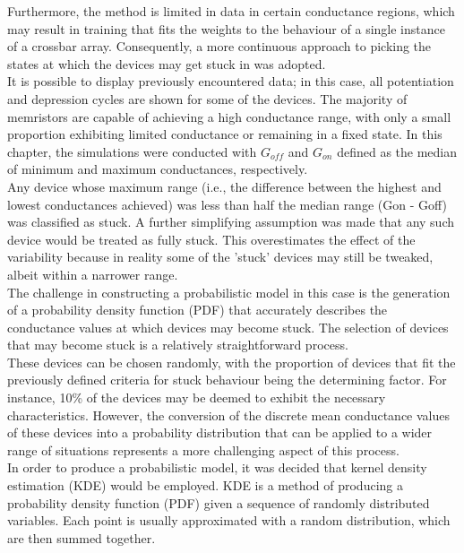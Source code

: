 \noindent Furthermore, the method is limited in data in certain conductance regions, which may result in training that fits the weights to the behaviour of a single instance of a crossbar array. Consequently, a more continuous approach to picking the states at which the devices may get stuck in was adopted.\\

\noindent It is possible to display previously encountered data; in this case, all potentiation and depression cycles are shown for some of the devices. The majority of memristors are capable of achieving a high conductance range, with only a small proportion exhibiting limited conductance or remaining in a fixed state. In this chapter, the simulations were conducted with $G_{off}$ and $G_{on}$ defined as the median of minimum and maximum conductances, respectively. \\

\noindent Any device whose maximum range (i.e., the difference between the highest and lowest conductances achieved) was less than half the median range (Gon - Goff) was classified as stuck. A further simplifying assumption was made that any such device would be treated as fully stuck. This overestimates the effect of the variability because in reality some of the 'stuck' devices may still be tweaked, albeit within a narrower range.\\

\noindent The challenge in constructing a probabilistic model in this case is the generation of a probability density function (PDF) that accurately describes the conductance values at which devices may become stuck. The selection of devices that may become stuck is a relatively straightforward process. \\

\noindent These devices can be chosen randomly, with the proportion of devices that fit the previously defined criteria for stuck behaviour being the determining factor. For instance, 10\% of the devices may be deemed to exhibit the necessary characteristics. However, the conversion of the discrete mean conductance values of these devices into a probability distribution that can be applied to a wider range of situations represents a more challenging aspect of this process.\\

\noindent In order to produce a probabilistic model, it was decided that kernel density estimation (KDE) would be employed. KDE is a method of producing a probability density function (PDF) given a sequence of randomly distributed variables. Each point is usually approximated with a random distribution, which are then summed together. \\

